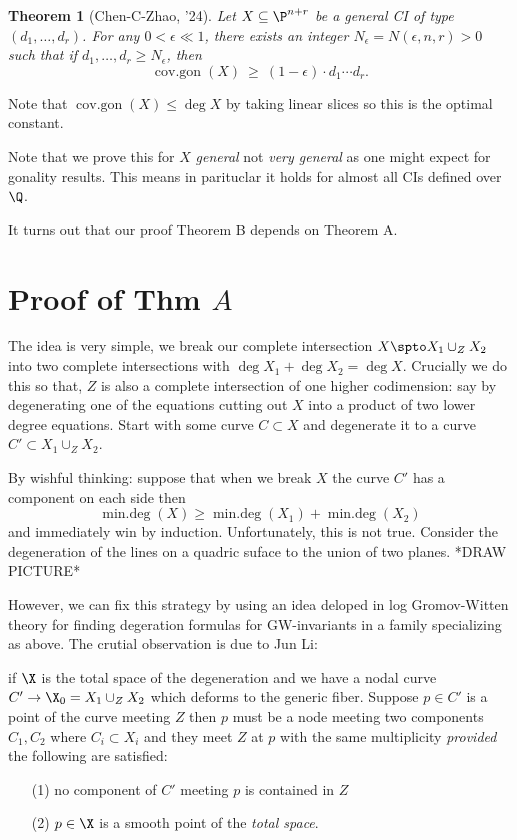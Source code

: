 \documentclass[12pt]{article}
\theoremstyle{plain}
\newtheorem{Lthm}{Theorem}
\DeclareMathOperator{\cg}{cov.gon}
\DeclareMathOperator{\covgon}{cov.gon}
\DeclareMathOperator{\mindeg}{min.deg}
\begin{document}
\begin{Lthm}[Chen-C-Zhao, '24]
Let $X \subseteq \P^{n+r}$ be a general CI of type $(d_1, \dots, d_r)$. For any $0 < \epsilon \ll 1$, there exists an integer $N_{\epsilon} = N(\epsilon, n, r) > 0$ such that if $d_1, \dots, d_r \ge N_\epsilon$, then
\[ \cg(X) \ \geq \  (1-\epsilon) \cdot d_{1} \cdots d_{r}. \]
\end{Lthm}

\begin{rmk}
Note that $\covgon(X) \le \deg{X}$ by taking linear slices so this is the optimal constant.
\end{rmk}

\begin{rmk}
Note that we prove this for $X$ \textit{general} not \textit{very general} as one might expect for gonality results. This means in parituclar it holds for almost all CIs defined over $\Q$. 
\end{rmk}

{\color{red} It turns out that our proof Theorem B depends on Theorem A. }

\section{Proof of Thm $A$}

The idea is very simple, we break our complete intersection $X \spto X_1 \cup_Z X_2$ into two complete intersections with $\deg{X_1} + \deg{X_2} = \deg{X}$. {\color{red} Crucially we do this so that, $Z$ is also a complete intersection of one higher codimension: say by degenerating one of the equations cutting out $X$ into a product of two lower degree equations.} Start with some curve $C \subset X$ and degenerate it to a curve $C' \subset X_1 \cup_Z X_2$.
\par 
By wishful thinking: suppose that when we break $X$ the curve $C'$ has a component on each side then
\[ \mindeg(X) \ge \mindeg(X_1) + \mindeg(X_2) \]
and immediately win by induction. {\color{red} Unfortunately, this is not true. Consider the degeneration of the lines on a quadric suface to the union of two planes. *DRAW PICTURE*}
\par 
However, we can fix this strategy by using an idea deloped in log Gromov-Witten theory for finding degeration formulas for GW-invariants in a family specializing as above. The crutial observation is due to Jun Li:

if $\X$ is the total space of the degeneration and we have a nodal curve $C' \to \X_0 = X_1 \cup_Z X_2$ which deforms to the generic fiber. Suppose $p \in C'$ is a point of the curve meeting $Z$ then $p$ must be a node meeting two components $C_1, C_2$ where $C_i \subset X_i$ and they meet $Z$ at $p$ with the same multiplicity \textit{provided} the following are satisfied:
\begin{enumerate}
\item[(1)] no component of $C'$ meeting $p$ is contained in $Z$
\item[(2)] $p \in \X$ is a smooth point of the \textit{total space}.
\end{enumerate}
 
\end{document}
